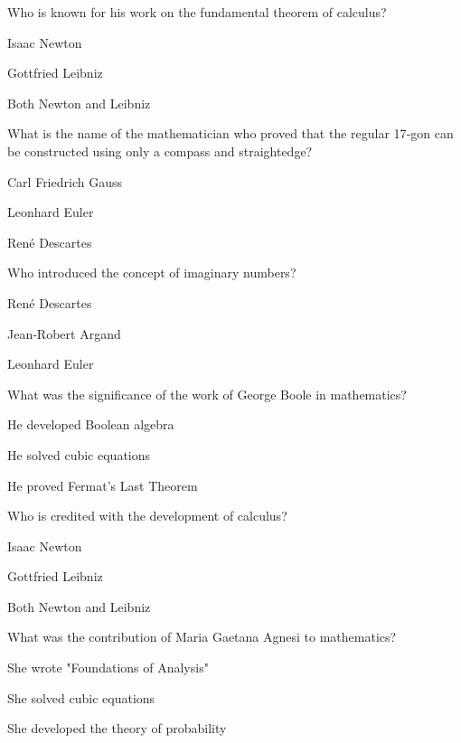\begin{enhancedmcq}{Who is known for his work on the fundamental theorem of calculus?}
\item Isaac Newton
\item Gottfried Leibniz
\item Both Newton and Leibniz

\end{enhancedmcq}
\begin{enhancedmcq}{What is the name of the mathematician who proved that the regular 17‑gon can be constructed using only a compass and straightedge?}
\item Carl Friedrich Gauss
\item Leonhard Euler
\item René Descartes

\end{enhancedmcq}
\begin{enhancedmcq}{Who introduced the concept of imaginary numbers?}
\item René Descartes
\item Jean‑Robert Argand
\item Leonhard Euler

\end{enhancedmcq}
\begin{enhancedmcq}{What was the significance of the work of George Boole in mathematics?}
\item He developed Boolean algebra
\item He solved cubic equations
\item He proved Fermat's Last Theorem

\end{enhancedmcq}
\begin{enhancedmcq}{Who is credited with the development of calculus?}
\item Isaac Newton
\item Gottfried Leibniz
\item Both Newton and Leibniz

\end{enhancedmcq}
\begin{enhancedmcq}{What was the contribution of Maria Gaetana Agnesi to mathematics?}
\item She wrote "Foundations of Analysis"
\item She solved cubic equations
\item She developed the theory of probability

\end{enhancedmcq}
